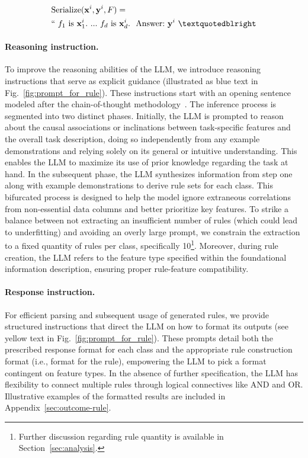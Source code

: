 \begin{align}
&\text{Serialize}(\mathbf{x}^i,\mathbf{y}^i, F) = \nonumber \\ 
&``\ f_1\ \text{is}\ \mathbf{x}^i_1.\ ... \ f_d\  \text{is}\  \mathbf{x}^i_d.\ \ \text{Answer:}\  \mathbf{y}^i\ ”
\end{align}

\vspace*{-0.12in}
\paragraph{Reasoning instruction.} To improve the reasoning abilities of the LLM, we introduce reasoning instructions that serve as explicit guidance (illustrated as blue text in Fig.~\ref{fig:prompt_for_rule}). These instructions start with an opening sentence modeled after the chain-of-thought methodology~\cite{wei2022chain}. The inference process is segmented into two distinct phases. Initially, the LLM is prompted to reason about the causal associations or inclinations between task-specific features and the overall task description, doing so independently from any example demonstrations and relying solely on its general or intuitive understanding. This enables the LLM to maximize its use of prior knowledge regarding the task at hand. In the subsequent phase, the LLM synthesizes information from step one along with example demonstrations to derive rule sets for each class. This bifurcated process is designed to help the model ignore extraneous correlations from non-essential data columns and better prioritize key features. To strike a balance between not extracting an insufficient number of rules (which could lead to underfitting) and avoiding an overly large prompt, we constrain the extraction to a fixed quantity of rules per class, specifically 10\footnote{Further discussion regarding rule quantity is available in Section~\ref{sec:analysis}.}. Moreover, during rule creation, the LLM refers to the feature type specified within the foundational information description, ensuring proper rule-feature compatibility.

\vspace*{-0.12in}
\paragraph{Response instruction.} For efficient parsing and subsequent usage of generated rules, we provide structured instructions that direct the LLM on how to format its outputs (see yellow text in Fig.~\ref{fig:prompt_for_rule}). These prompts detail both the prescribed response format for each class and the appropriate rule construction format (i.e., format for the rule), empowering the LLM to pick a format contingent on feature types. In the absence of further specification, the LLM has flexibility to connect multiple rules through logical connectives like AND and OR. Illustrative examples of the formatted results are included in Appendix~\ref{sec:outcome-rule}.

